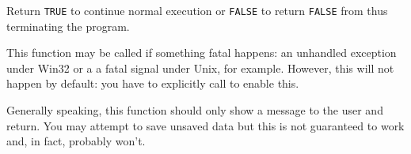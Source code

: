 Return {\tt TRUE} to continue normal execution or {\tt FALSE} to return 
{\tt FALSE} from  thus terminating the program.



\label{wxapponfatalexception}


This function may be called if something fatal happens: an unhandled
exception under Win32 or a a fatal signal under Unix, for example. However,
this will not happen by default: you have to explicitly call 
 to enable this.

Generally speaking, this function should only show a message to the user and
return. You may attempt to save unsaved data but this is not guaranteed to
work and, in fact, probably won't.



